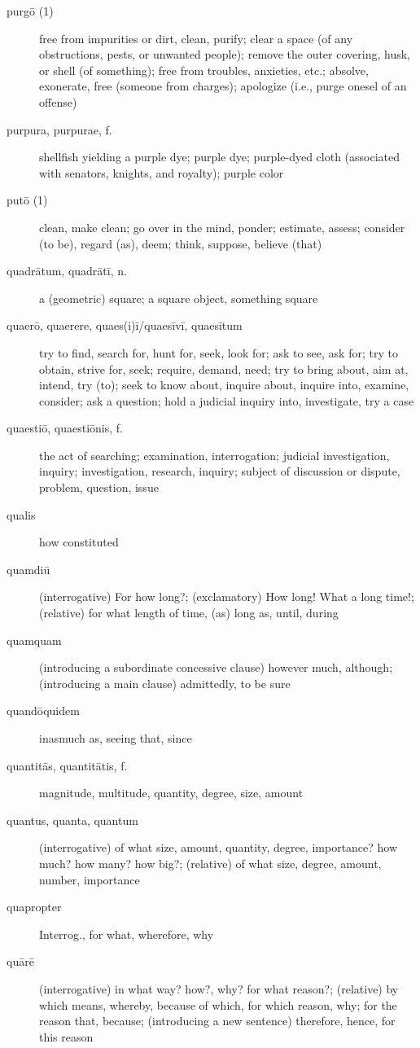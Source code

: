 \begin{description}
    \item[purgō (1)] free from impurities or dirt, clean, purify; clear a space (of any obstructions, pests, or unwanted people); remove the outer covering, husk, or shell (of something); free from troubles, anxieties, etc.; absolve, exonerate, free (someone from charges); apologize (i.e., purge onesel of an offense)
    \item[purpura, purpurae, f.] shellfish yielding a purple dye; purple dye; purple-dyed cloth (associated with senators, knights, and royalty); purple color
    \item[putō (1)] clean, make clean; go over in the mind, ponder; estimate, assess; consider (to be), regard (as), deem; think, suppose, believe (that)
    \item[quadrātum, quadrātī, n.] a (geometric) square; a square object, something square
    \item[quaerō, quaerere, quaes(i)ī/quaesīvī, quaesītum] try to find, search for, hunt for, seek, look for; ask to see, ask for; try to obtain, strive for, seek; require, demand, need; try to bring about, aim at, intend, try (to); seek to know about, inquire about, inquire into, examine, consider; ask a question; hold a judicial inquiry into, investigate, try a case
    \item[quaestiō, quaestiōnis, f.] the act of searching; examination, interrogation; judicial investigation, inquiry; investigation, research, inquiry; subject of discussion or dispute, problem, question, issue
    \item[qualis] how constituted
    \item[quamdiū] (interrogative) For how long?; (exclamatory) How long! What a long time!; (relative) for what length of time, (as) long as, until, during
    \item[quamquam] (introducing a subordinate concessive clause) however much, although; (introducing a main clause) admittedly, to be sure
    \item[quandōquidem] inasmuch as, seeing that, since
    \item[quantitās, quantitātis, f.] magnitude, multitude, quantity, degree, size, amount
    \item[quantus, quanta, quantum] (interrogative) of what size, amount, quantity, degree, importance? how much? how many? how big?; (relative) of what size, degree, amount, number, importance
    \item[quapropter] Interrog., for what, wherefore, why
    \item[quārē] (interrogative) in what way? how?, why? for what reason?; (relative) by which means, whereby, because of which, for which reason, why; for the reason that, because; (introducing a new sentence) therefore, hence, for this reason

\end{description}
